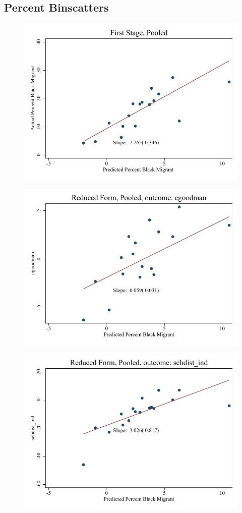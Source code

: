 \documentclass{article}
\begin{document}
\subsection{Percent Binscatters}
\clearpage
\begin{figure}
	\centering
	\includegraphics[width=.8\textwidth]{figures/binscatter/pooled_fs_percent.pdf}
\end{figure}
\clearpage
\begin{figure}
	\centering
	\includegraphics[width=.8\textwidth]{figures/binscatter/pooled_cgoodman_rf_percent.pdf}
\end{figure}
\clearpage
\begin{figure}
	\centering
	\includegraphics[width=.8\textwidth]{figures/binscatter/pooled_schdist_ind_rf_percent.pdf}
\end{figure}
\end{document}
